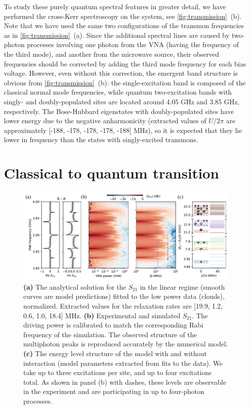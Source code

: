 \documentclass[%
 aps, pra,
 amsmath,amssymb,
 reprint,%
superscriptaddress
]{revtex4-2}
\begin{document}
To study these purely quantum spectral features in greater detail, we have performed the cross-Kerr spectroscopy on the system, see \autoref{fig:transmission}~(b). Note that we have used the same two configurations of the transmon frequencies as in \autoref{fig:transmission}~(a). Since the additional spectral lines are caused by two-photon processes involving one photon from the VNA (having the frequency of the third mode), and another from the microwave source, their observed frequencies should be corrected by adding the third mode frequency for each bias voltage. However, even without this correction, the emergent band structure is obvious from \autoref{fig:transmission}~(b): the single-excitation band is composed of the classical normal mode frequencies, while quantum two-excitation bands with singly- and doubly-populated sites are located around 4.05 GHz and 3.85 GHz, respectively. The Bose-Hubbard eigenstates with doubly-populated sites have lower energy due to the negative anharmonicity (extracted values of $U/2\pi$ are approximately [-188, -178, -178, -178, -188] MHz), so it is expected that they lie lower in frequency than the states with singly-excited transmons. 


\section{Classical to quantum transition}



\begin{figure}[t]
	\centering
	\includegraphics[width=\linewidth]{Pictures/fig3}
	\caption{\textbf{(a)} The analytical solution for the $S_{21}$ in the linear regime (smooth curves are model predictions) fitted to the low power data (clouds), normalized. Extracted values for the relaxation rates are [19.9,  1.2,  0.6,  1.0, 18.4] MHz. \textbf{(b)} Experimental and simulated $S_{21}$. The driving power is calibrated to match the corresponding Rabi frequency of the simulation. The observed structure of the multiphoton peaks is reproduced accurately by the numerical model. \textbf{(c)} The energy level structure of the model with and without interaction (model parameters extracted from fits to the data). We take up to three excitations per site, and up to four excitations total. As shown in panel (b) with dashes, these levels are observable in the experiment and are participating in up to four-photon processes.}
	\label{fig:cq_transition}
\end{figure}
\end{document}
